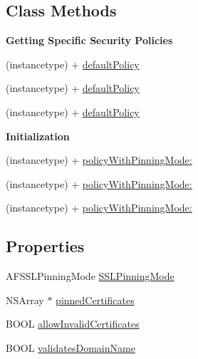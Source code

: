 \subsection*{Class Methods}
\begin{Indent}\textbf{ Getting Specific Security Policies}\par
{\em 

 

 }\begin{DoxyCompactItemize}
\item 
(instancetype) + \mbox{\hyperlink{interface_a_f_security_policy_aa63c18e904ef6e42761b7c20a1af2f3f}{default\+Policy}}
\item 
(instancetype) + \mbox{\hyperlink{interface_a_f_security_policy_aa63c18e904ef6e42761b7c20a1af2f3f}{default\+Policy}}
\item 
(instancetype) + \mbox{\hyperlink{interface_a_f_security_policy_aa63c18e904ef6e42761b7c20a1af2f3f}{default\+Policy}}
\end{DoxyCompactItemize}
\end{Indent}
\begin{Indent}\textbf{ Initialization}\par
{\em 

 

 }\begin{DoxyCompactItemize}
\item 
(instancetype) + \mbox{\hyperlink{interface_a_f_security_policy_a94c44f7101fa4d0954d0c63f72f1e9cd}{policy\+With\+Pinning\+Mode\+:}}
\item 
(instancetype) + \mbox{\hyperlink{interface_a_f_security_policy_a94c44f7101fa4d0954d0c63f72f1e9cd}{policy\+With\+Pinning\+Mode\+:}}
\item 
(instancetype) + \mbox{\hyperlink{interface_a_f_security_policy_a94c44f7101fa4d0954d0c63f72f1e9cd}{policy\+With\+Pinning\+Mode\+:}}
\end{DoxyCompactItemize}
\end{Indent}
\subsection*{Properties}
\begin{DoxyCompactItemize}
\item 
A\+F\+S\+S\+L\+Pinning\+Mode \mbox{\hyperlink{interface_a_f_security_policy_ae9a77137a0fcecbb05ac30e5e1ce8092}{S\+S\+L\+Pinning\+Mode}}
\item 
N\+S\+Array $\ast$ \mbox{\hyperlink{interface_a_f_security_policy_a7ceb752aec14fd94d31ed428477cec5d}{pinned\+Certificates}}
\item 
B\+O\+OL \mbox{\hyperlink{interface_a_f_security_policy_a4187dab7a2429bd032513b68934837e3}{allow\+Invalid\+Certificates}}
\item 
B\+O\+OL \mbox{\hyperlink{interface_a_f_security_policy_ae088468652f51c0f92203ef827e1aef0}{validates\+Domain\+Name}}
\end{DoxyCompactItemize}


